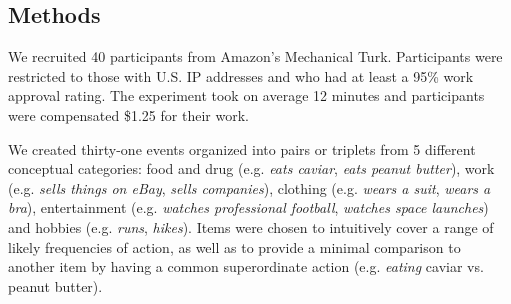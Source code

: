 \documentclass[10pt,letterpaper]{article}
\begin{document}
\subsection{Methods}
\vspace{-0.5ex}

We recruited 40 participants from Amazon's Mechanical Turk.
Participants were restricted to those with U.S. IP addresses and who had at least a 95\% work approval rating.
The experiment took on average 12 minutes and participants were compensated \$1.25 for their work.

We created thirty-one events organized into pairs or triplets from 5 different conceptual categories: food and drug (e.g. \emph{eats caviar}, \emph{eats peanut butter}), work (e.g. \emph{sells things on eBay}, \emph{sells companies}), clothing (e.g. \emph{wears a suit}, \emph{wears a bra}), entertainment (e.g. \emph{watches professional football}, \emph{watches space launches}) and hobbies (e.g. \emph{runs}, \emph{hikes}). 
Items were chosen to intuitively cover a range of likely frequencies of action, as well as to provide a minimal comparison to another item by having a common superordinate action (e.g. \emph{eating} caviar vs. peanut butter).
\end{document}
